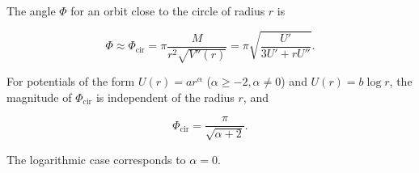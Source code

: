 The angle $\Phi$ for an orbit close to the circle of radius $r$ is

$$\Phi \approx \Phi_{\text{cir}} = \pi \frac{M}{r^2 \sqrt{V''(r)}} = \pi \sqrt{\frac{U'}{3U' + rU''}}.$$

For potentials of the form $U(r) = ar^\alpha$ ($\alpha \geq -2, \alpha \neq 0$) and $U(r) = b \log r$, the magnitude of $\Phi_{\text{cir}}$ is independent of the radius $r$, and

$$\Phi_{\text{cir}} = \frac{\pi}{\sqrt{\alpha + 2}}.$$

The logarithmic case corresponds to $\alpha = 0$.
